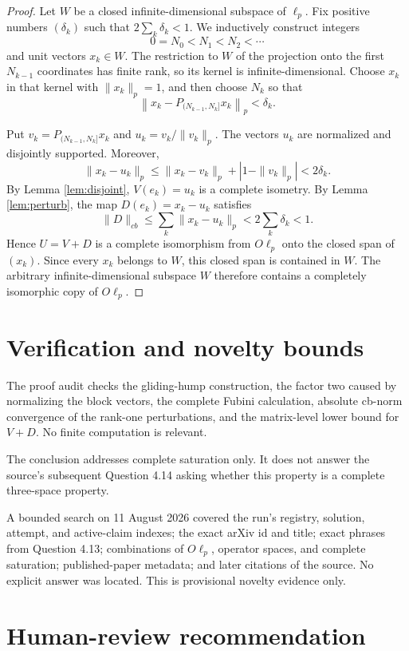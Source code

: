 \documentclass[11pt]{article}
\begin{document}
\begin{proof}
Let $W$ be a closed infinite-dimensional subspace of $\ell_p$. Fix positive
numbers $(\delta_k)$ such that $2\sum_k\delta_k<1$. We inductively construct
integers
\[
 0=N_0<N_1<N_2<\cdots
\]
and unit vectors $x_k\in W$. The restriction to $W$ of the projection onto
the first $N_{k-1}$ coordinates has finite rank, so its kernel is
infinite-dimensional. Choose $x_k$ in that kernel with $\|x_k\|_p=1$, and
then choose $N_k$ so that
\[
 \left\|x_k-P_{(N_{k-1},N_k]}x_k\right\|_p<\delta_k.
\]

Put $v_k=P_{(N_{k-1},N_k]}x_k$ and $u_k=v_k/\|v_k\|_p$. The vectors $u_k$
are normalized and disjointly supported. Moreover,
\[
 \|x_k-u_k\|_p
 \leq \|x_k-v_k\|_p+|1-\|v_k\|_p|
 <2\delta_k.
\]
By Lemma \ref{lem:disjoint}, $V(e_k)=u_k$ is a complete isometry. By Lemma
\ref{lem:perturb}, the map $D(e_k)=x_k-u_k$ satisfies
\[
 \|D\|_{cb}\leq\sum_k\|x_k-u_k\|_p
 <2\sum_k\delta_k<1.
\]
Hence $U=V+D$ is a complete isomorphism from $O\ell_p$ onto the closed span
of $(x_k)$. Since every $x_k$ belongs to $W$, this closed span is contained
in $W$. The arbitrary infinite-dimensional subspace $W$ therefore contains
a completely isomorphic copy of $O\ell_p$.
\end{proof}

\section{Verification and novelty bounds}

The proof audit checks the gliding-hump construction, the factor two caused
by normalizing the block vectors, the complete Fubini calculation, absolute
cb-norm convergence of the rank-one perturbations, and the matrix-level
lower bound for $V+D$. No finite computation is relevant.

The conclusion addresses complete saturation only. It does not answer the
source's subsequent Question 4.14 asking whether this property is a complete
three-space property.

A bounded search on 11 August 2026 covered the run's registry, solution,
attempt, and active-claim indexes; the exact arXiv id and title; exact phrases
from Question 4.13; combinations of $O\ell_p$, operator spaces, and complete
saturation; published-paper metadata; and later citations of the source. No
explicit answer was located. This is provisional novelty evidence only.

\section*{Human-review recommendation}
\end{document}
